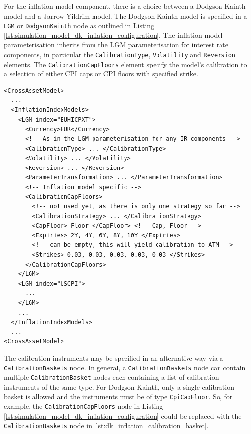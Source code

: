 \medskip

For the inflation model component, there is a choice between a Dodgson Kainth model and a Jarrow Yildrim model. The Dodgson Kainth
model is specified in a \lstinline!LGM! or \lstinline!DodgsonKainth! node as outlined in Listing \ref{lst:simulation_model_dk_inflation_configuration}.
The inflation model parameterisation inherits from the LGM parameterisation for interest rate components, in particular the \lstinline!CalibrationType!,
\lstinline!Volatility! and \lstinline!Reversion! elements. The \lstinline!CalibrationCapFloors! element specify the model's calibration to a selection of
either CPI caps or CPI floors with specified strike.

\begin{listing}[H]
\begin{verbatim}
<CrossAssetModel>
  ...
  <InflationIndexModels>
    <LGM index="EUHICPXT">
      <Currency>EUR</Currency>
      <!-- As in the LGM parameterisation for any IR components -->
      <CalibrationType> ... </CalibrationType>
      <Volatility> ... </Volatility>
      <Reversion> ... </Reversion>
      <ParameterTransformation> ... </ParameterTransformation>
      <!-- Inflation model specific -->
      <CalibrationCapFloors>
        <!-- not used yet, as there is only one strategy so far -->
        <CalibrationStrategy> ... </CalibrationStrategy>
        <CapFloor> Floor </CapFloor> <!-- Cap, Floor -->
        <Expiries> 2Y, 4Y, 6Y, 8Y, 10Y </Expiries>
        <!-- can be empty, this will yield calibration to ATM -->
        <Strikes> 0.03, 0.03, 0.03, 0.03, 0.03 </Strikes>
      </CalibrationCapFloors>
    </LGM>
    <LGM index="USCPI">
      ...
    </LGM>
    ...
  </InflationIndexModels>
  ...
<CrossAssetModel>
\end{verbatim}
\caption{Simulation model DK inflation component configuration}
\label{lst:simulation_model_dk_inflation_configuration}
\end{listing}

The calibration instruments may be specified in an alternative way via a \lstinline!CalibrationBaskets! node. In general, a \lstinline!CalibrationBaskets! node
can contain multiple \lstinline!CalibrationBasket! nodes each containing a list of calibration instruments of the same type. For Dodgson Kainth, only a single
calibration basket is allowed and the instruments must be of type \lstinline!CpiCapFloor!. So, for example, the \lstinline!CalibrationCapFloors! node in
Listing \ref{lst:simulation_model_dk_inflation_configuration} could be replaced with the \lstinline!CalibrationBaskets! node in \ref{lst:dk_inflation_calibration_basket}.

